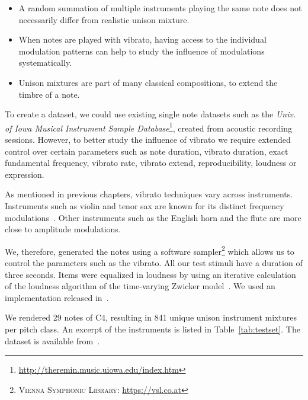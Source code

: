 \begin{itemize}
  \item A random summation of multiple instruments playing the same note does not necessarily differ from realistic unison mixture.
  \item When notes are played with vibrato, having access to the individual modulation patterns can help to study the influence of modulations systematically.
  \item Unison mixtures are part of many classical compositions, to extend the timbre of a note.
\end{itemize}

\par
To create a dataset, we could use existing single note datasets such as the \emph{Univ. of Iowa Musical Instrument Sample Database}\footnote{\url{http://theremin.music.uiowa.edu/index.htm}}, created from acoustic recording sessions.
However, to better study the influence of vibrato we require extended control over certain parameters such as note duration, vibrato duration, exact fundamental frequency, vibrato rate, vibrato extend, reproducibility, loudness or expression.
\par
As mentioned in previous chapters, vibrato techniques vary across instruments. Instruments such as violin and tenor sax are known for its distinct frequency modulations~\cite{gilbert05}.
Other instruments such as the English horn and the flute are more close to amplitude modulations.
\par
We, therefore, generated the notes using a software sampler\footnote{\textsc{Vienna Symphonic Library}: \url{https://vsl.co.at}} which allows us to control the parameters such as the vibrato.
All our test stimuli have a duration of three seconds.
Items were equalized in loudness by using an iterative calculation of the loudness algorithm of the time-varying Zwicker model~\cite{zwicker13}. 
We used an implementation released in~\cite{genesis12}. 
\par
We rendered 29 notes of C4, resulting in 841 unique unison instrument mixtures per pitch class.
An excerpt of the instruments is listed in Table~\ref{tab:testset}.
The dataset is available from~\cite{oss_unison}.

